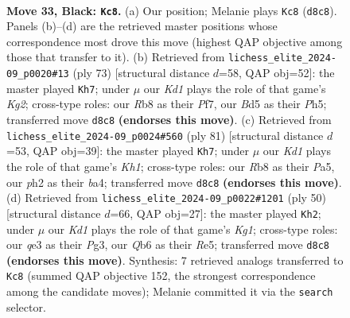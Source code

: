\documentclass[11pt]{article}
\begin{document}
\clearpage

\begin{figure}[p]\centering
\begin{subfigure}{0.46\textwidth}\centering
\resizebox{\linewidth}{!}{%
\newchessgame
\chessboard[
  setfen={1r1k4/p4p1p/1qp5/2Nb4/3P2r1/4Q1P1/5P1P/2R3K1 b - - 2 33},
  showmover=false,
  pgfstyle=straightmove, color=movearrow, markmove={d8-c8}
]}
\caption{}
\end{subfigure}\hfill
\begin{subfigure}{0.46\textwidth}\centering
\resizebox{\linewidth}{!}{%
\newchessgame
\chessboard[
  setfen={8/5pk1/r4q2/P2p3p/R2Nb1p1/4Q1P1/5P1P/6K1 b - - 4 37},
  showmover=false,
  pgfstyle=straightmove, color=movearrow, markmove={g7-h7}
]}
\caption{}
\end{subfigure}
\\[4pt]
\begin{subfigure}{0.46\textwidth}\centering
\resizebox{\linewidth}{!}{%
\newchessgame
\chessboard[
  setfen={r2q3k/2r2pp1/2P4p/p1QN4/B3p3/3bP2P/5PP1/2R3K1 b - - 0 41},
  showmover=false,
  pgfstyle=straightmove, color=movearrow, markmove={h8-h7}
]}
\caption{}
\end{subfigure}\hfill
\begin{subfigure}{0.46\textwidth}\centering
\resizebox{\linewidth}{!}{%
\newchessgame
\chessboard[
  setfen={3r2k1/pq3pp1/1p2n2p/4R2Q/7P/2B3P1/PP3P2/6K1 w - - 0 26},
  showmover=false,
  pgfstyle=straightmove, color=movearrow, markmove={g1-h2}
]}
\caption{}
\end{subfigure}
\caption{\textbf{Move 33, Black: \texttt{Kc8}.} (a) Our position; Melanie plays \texttt{Kc8} (\texttt{d8c8}). Panels (b)--(d) are the retrieved master positions whose correspondence most drove this move (highest QAP objective among those that transfer to it). (b) Retrieved from \texttt{lichess\_elite\_2024-09\_p0020\#13} (ply 73) [structural distance $d$=58, QAP obj=52]: the master played \texttt{Kh7}; under $\mu$ our \emph{Kd1} plays the role of that game's \emph{Kg2}; cross-type roles: our \emph{R}b8 as their \emph{P}f7, our \emph{B}d5 as their \emph{P}h5; transferred move \texttt{d8c8} \textbf{(endorses this move)}. (c) Retrieved from \texttt{lichess\_elite\_2024-09\_p0024\#560} (ply 81) [structural distance $d$=53, QAP obj=39]: the master played \texttt{Kh7}; under $\mu$ our \emph{Kd1} plays the role of that game's \emph{Kh1}; cross-type roles: our \emph{R}b8 as their \emph{P}a5, our \emph{p}h2 as their \emph{b}a4; transferred move \texttt{d8c8} \textbf{(endorses this move)}. (d) Retrieved from \texttt{lichess\_elite\_2024-09\_p0022\#1201} (ply 50) [structural distance $d$=66, QAP obj=27]: the master played \texttt{Kh2}; under $\mu$ our \emph{Kd1} plays the role of that game's \emph{Kg1}; cross-type roles: our \emph{q}e3 as their \emph{P}g3, our \emph{Q}b6 as their \emph{R}e5; transferred move \texttt{d8c8} \textbf{(endorses this move)}. Synthesis: 7 retrieved analogs transferred to \texttt{Kc8} (summed QAP objective 152, the strongest correspondence among the candidate moves); Melanie committed it via the \texttt{search} selector.}
\label{fig:thought-m65}
\end{figure}
\end{document}
